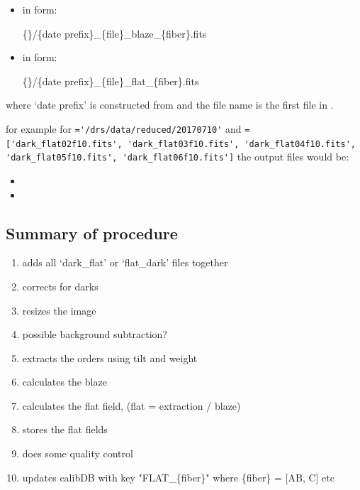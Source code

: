 \begin{itemize}

\item {} in form:
\begin{tcustomdir}
\{\reduceddir\}/\{date prefix\}\_\{file\}\_blaze\_\{fiber\}.fits
\end{tcustomdir}

\item {} in form:
\begin{tcustomdir}
\{\reduceddir\}/\{date prefix\}\_\{file\}\_flat\_\{fiber\}.fits
\end{tcustomdir}

\end{itemize}


\noindent where `date prefix' is constructed from \argnightname and the file name is the first file in \argfilenames.


\noindent for example for \reduceddir\lstinline[style=pythoninline]|='/drs/data/reduced/20170710'| and \argfilenames\lstinline[style=pythoninline]|=['dark_flat02f10.fits', 'dark_flat03f10.fits', 'dark_flat04f10.fits', 'dark_flat05f10.fits', 'dark_flat06f10.fits']| the output files would be:
\begin{tcustomdir}
\begin{itemize}
\item {}
\item {}
\end{itemize}
\end{tcustomdir}

\subsection{Summary of procedure}
\begin{enumerate}
\item adds all `dark\_flat' or `flat\_dark' files together
\item corrects for darks
\item resizes the image
\item possible background subtraction?
\item extracts the orders using tilt and weight
\item calculates the blaze
\item calculates the flat field, (flat = extraction / blaze)
\item stores the flat fields
\item does some quality control
\item updates calibDB with key "FLAT\_\{fiber\}" where \{fiber\} = [AB, C] etc
\end{enumerate}


